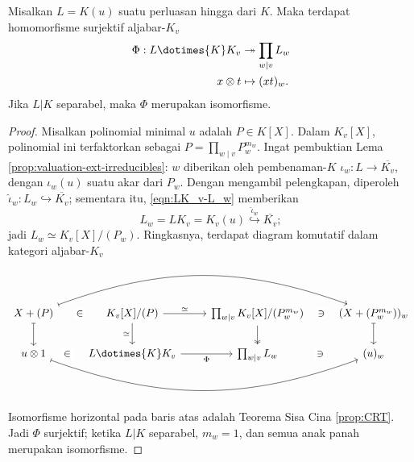 \begin{theorem}\label{prop:valuation-tensor}
	Misalkan $L=K(u)$ suatu perluasan hingga dari $K$. Maka terdapat homomorfisme surjektif aljabar-$K_v$
	\begin{align*}
		\Phi: L \dotimes{K} K_v & \twoheadrightarrow \prod_{w \mid v} L_w \\
		x \otimes t & \mapsto (xt)_w.
	\end{align*}
	Jika $L|K$ separabel, maka $\Phi$ merupakan isomorfisme.
\end{theorem}
\begin{proof}
	Misalkan polinomial minimal $u$ adalah $P \in K[X]$. Dalam $K_v[X]$, polinomial ini terfaktorkan sebagai $P = \prod_{w \mid v} P_w^{m_w}$. Ingat pembuktian Lema \ref{prop:valuation-ext-irreducibles}: $w$ diberikan oleh pembenaman-$K$ $\iota_w: L \to \overline{K_v}$, dengan $\iota_w(u)$ suatu akar dari $P_w$. Dengan mengambil pelengkapan, diperoleh $\hat{\iota}_w: L_w \hookrightarrow \overline{K_v}$; sementara itu, \eqref{eqn:LK_v-L_w} memberikan
	\[ L_w = LK_v = K_v(u) \stackrel{\hat{\iota}_w}{\hookrightarrow} \overline{K_v}; \]
	jadi $L_w \simeq K_v[X]/(P_w)$. Ringkasnya, terdapat diagram komutatif dalam kategori aljabar-$K_v$
	\[\begin{tikzcd}
		X+(P) \arrow[phantom, r, "\in" description] \arrow[mapsto, d] \arrow[mapsto, rrr, bend left=20] & K_v[X]/(P) \arrow[r, "\simeq"] \arrow[d, "\simeq"'] & \prod_{w \mid v} K_v[X]/(P_w^{m_w}) \arrow[twoheadrightarrow, d] & (X + (P_w^{m_w}))_w \arrow[phantom, l, "\ni" description] \arrow[mapsto, d] \\
		u \otimes 1 \arrow[phantom, r, "\in" description] \arrow[mapsto, rrr, bend right=20] & L \dotimes{K} K_v \arrow[r, "\Phi"'] & \prod_{w \mid v} L_w & (u)_w \arrow[phantom, l, "\ni" description]
	\end{tikzcd}\]
	Isomorfisme horizontal pada baris atas adalah Teorema Sisa Cina \ref{prop:CRT}. Jadi $\Phi$ surjektif; ketika $L|K$ separabel, $m_w = 1$, dan semua anak panah merupakan isomorfisme.
\end{proof}

